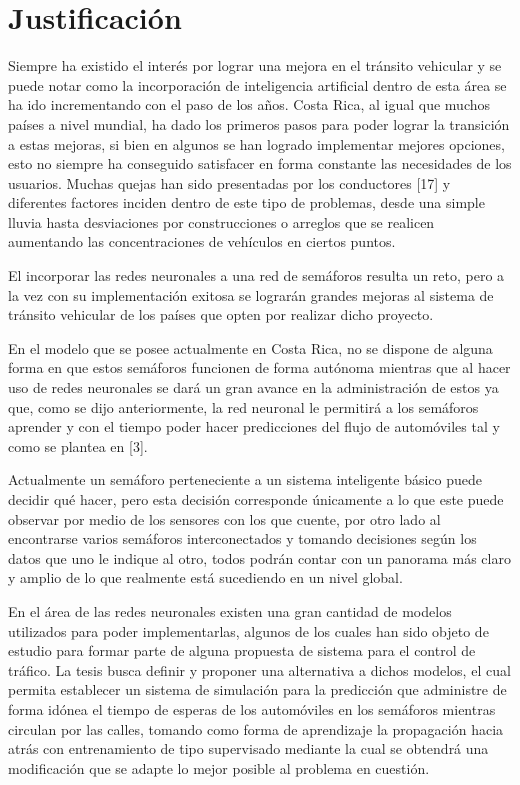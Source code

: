 \section{Justificaci\'{o}n}

		
		Siempre ha existido el inter\'{e}s por lograr una mejora en el tr\'{a}nsito vehicular
	y se puede notar como la incorporaci\'{o}n de inteligencia artificial dentro de esta
	\'{a}rea  se ha ido incrementando con el paso de los a\~{n}os. Costa Rica, al igual que muchos pa\'{i}ses a nivel mundial, ha dado los primeros pasos para poder lograr la transici\'{o}n a estas mejoras, si bien en algunos se han logrado implementar mejores opciones, esto no siempre ha conseguido satisfacer en forma constante las necesidades de los usuarios. Muchas quejas han sido presentadas por los conductores [17] y diferentes factores inciden dentro de este tipo de problemas, desde una simple lluvia hasta desviaciones por construcciones o arreglos que se realicen aumentando las concentraciones de veh\'{i}culos en ciertos puntos.
	
		El incorporar las redes neuronales a una red de sem\'{a}foros resulta un reto,
	pero a la vez con su implementaci\'{o}n exitosa se lograr\'{a}n grandes mejoras al sistema
	de tr\'{a}nsito vehicular de los pa\'{i}ses que opten por realizar dicho proyecto.
	
		En el modelo que se posee actualmente en Costa Rica, no se dispone de alguna
	forma en que estos sem\'{a}foros funcionen de forma aut\'{o}noma mientras que al hacer
	uso de redes neuronales se dar\'{a} un gran avance en la administraci\'{o}n de estos ya
	que, como se dijo anteriormente, la red neuronal le permitir\'{a} a los sem\'{a}foros aprender y con el tiempo poder hacer predicciones del flujo de autom\'{o}viles tal y como se plantea en [3].
	
		Actualmente un sem\'{a}foro perteneciente a un sistema inteligente b\'{a}sico puede
	decidir qu\'{e} hacer, pero esta decisi\'{o}n corresponde \'{u}nicamente a lo que este
	puede observar por medio de los sensores con los que cuente, por otro lado al
	encontrarse varios sem\'{a}foros interconectados y tomando decisiones seg\'{u}n los datos que uno le indique al otro, todos podr\'{a}n contar con un panorama m\'{a}s claro y amplio de lo que realmente est\'{a} sucediendo en un nivel global.
	
		En el \'{a}rea de las redes neuronales existen una gran cantidad de modelos
	utilizados para poder implementarlas, algunos de los cuales han sido objeto de
	estudio para formar parte de alguna propuesta de sistema para el control de
	tr\'{a}fico. La tesis busca definir y  proponer una alternativa a dichos modelos, el cual permita establecer un sistema de simulaci\'{o}n para la predicci\'{o}n que administre de forma id\'{o}nea el tiempo de esperas de los autom\'{o}viles en los sem\'{a}foros mientras circulan por las calles, tomando como forma de aprendizaje la propagaci\'{o}n hacia atr\'{a}s con entrenamiento de tipo supervisado mediante la cual se obtendr\'{a} una modificaci\'{o}n que se adapte lo mejor posible al problema en cuesti\'{o}n.
	
